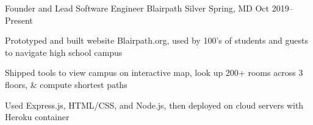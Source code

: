 \experience
{Founder and Lead Software Engineer}
{Blairpath}
{Silver Spring, MD}
{Oct 2019--Present}
{
	\item Prototyped and built website Blairpath.org, used by 100's of students and guests to navigate high school campus
	\item Shipped tools to view campus on interactive map, look up 200+ rooms across 3 floors, \& compute shortest paths
	\item Used Express.js, HTML/CSS, and Node.js, then deployed on cloud servers with Heroku container
}
